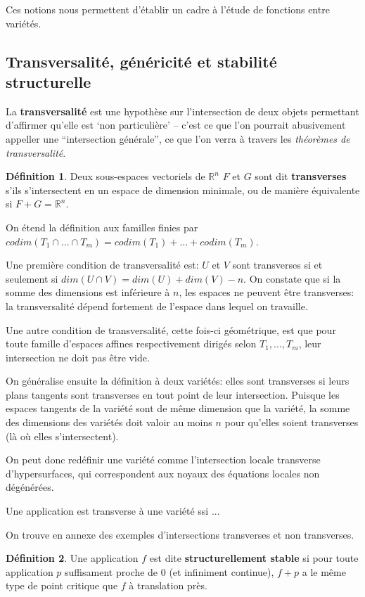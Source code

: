 \documentclass{article}
\newcommand{\R}{\mathbb{R}}
\theoremstyle{definition}
\newtheorem{defn}{Définition}
\begin{document}
Ces notions nous permettent d'établir un cadre à l'étude de fonctions entre variétés.

\subsection{Transversalité, généricité et stabilité structurelle}

La \textbf{transversalité} est une hypothèse sur l'intersection de deux objets permettant d'affirmer qu'elle est `non particulière' -- c'est ce que l'on pourrait abusivement appeller une ``intersection générale'', ce que l'on verra à travers les \textit{théorèmes de transversalité}.

\begin{defn}
	Deux sous-espaces vectoriels de $\R^n$ $F$ et $G$ sont dit \textbf{transverses} s'ils s'intersectent en un espace de dimension minimale, ou de manière équivalente si $F+G=\R^n$.

	On étend la définition aux familles finies par $codim(T_1\cap...\cap T_m)=codim(T_1)+...+codim(T_m)$.
\end{defn}

Une première condition de transversalité est: $U$ et $V$ sont transverses si et seulement si $dim(U\cap V)=dim(U)+dim(V)-n$.
On constate que si la somme des dimensions est inférieure à $n$, les espaces ne peuvent être transverses: la transversalité dépend fortement de l'espace dans lequel on travaille.

Une autre condition de transversalité, cette fois-ci géométrique, est que pour toute famille d'espaces affines respectivement dirigés selon $T_1,...,T_m$, leur intersection ne doit pas être vide.

On généralise ensuite la définition à deux variétés: elles sont transverses si leurs plans tangents sont transverses en tout point de leur intersection.
Puisque les espaces tangents de la variété sont de même dimension que la variété, la somme des dimensions des variétés doit valoir au moins $n$ pour qu'elles soient transverses (là où elles s'intersectent).

On peut donc redéfinir une variété comme l'intersection locale transverse d'hypersurfaces, qui correspondent aux noyaux des équations locales non dégénérées.

Une application est transverse à une variété ssi ...

On trouve en annexe des exemples d'intersections transverses et non transverses.

\begin{defn}
	Une application $f$ est dite \textbf{structurellement stable} si pour toute application $p$ suffisament proche de 0 (et infiniment continue), $f+p$ a le même type de point critique que $f$ à translation près.
\end{defn}
\end{document}
